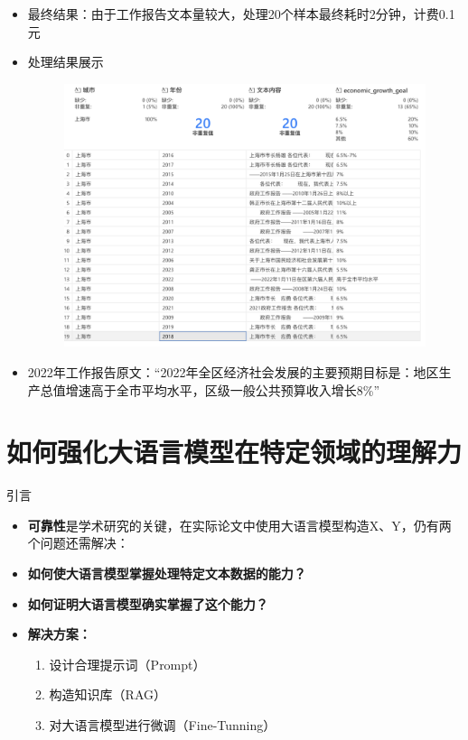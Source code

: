 \documentclass{beamer}
\begin{document}
\begin{frame}[fragile]
	\begin{itemize}
		\item 最终结果：由于工作报告文本量较大，处理20个样本最终耗时2分钟，计费0.1元
		\item 处理结果展示
		\begin{figure}[htpb]
			\centering
			\includegraphics[width=0.8\linewidth]{figs/处理结果.png}
		\end{figure}
		\item 2022年工作报告原文：“2022年全区经济社会发展的主要预期目标是：地区生产总值增速高于全市平均水平，区级一般公共预算收入增长8\%”
	\end{itemize}
\end{frame}

\section{如何强化大语言模型在特定领域的理解力}
\begin{frame}[fragile] {引言}
	\begin{itemize}
		\item \textbf{可靠性}是学术研究的关键，在实际论文中使用大语言模型构造X、Y，仍有两个问题还需解决：
		\item \textbf{如何使大语言模型掌握处理特定文本数据的能力？}
		\item \textbf{如何证明大语言模型确实掌握了这个能力？}


\item \textbf{解决方案：}
	\begin{enumerate}
	\item 设计合理提示词（Prompt）
	\item 构造知识库（RAG）
	\item 对大语言模型进行微调（Fine-Tunning）
\end{enumerate}
	\end{itemize}
\end{frame}
\end{document}
